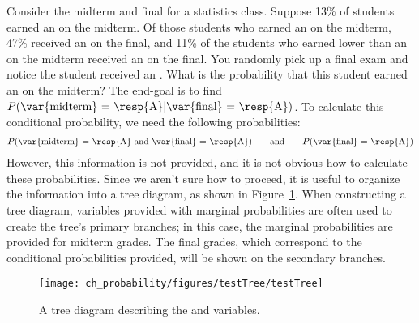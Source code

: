 \begin{example}{Consider the midterm and final for a statistics class. Suppose 13\% of students earned an  on the midterm. Of those students who earned an  on the midterm, 47\% received an  on the final, and 11\% of the students who earned lower than an  on the midterm received an  on the final. You randomly pick up a final exam and notice the student received an . What is the probability that this student earned an  on the midterm?} \label{exerciseForTreeDiagramOfStudentGettingAOnMidtermGivenThatSheGotAOnFinal}
The end-goal is to find $P(\text{\var{midterm} = \resp{A}} | \text{\var{final} = \resp{A}})$. To calculate this conditional probability, we need the following probabilities:
\begin{eqnarray*}
P(\text{\var{midterm} = \resp{A} and \var{final} = \resp{A}}) \qquad\text{and}\qquad
P(\text{\var{final} = \resp{A}})
\end{eqnarray*}
However, this information is not provided, and it is not obvious how to calculate these probabilities. Since we aren't sure how to proceed, it is useful to organize the information into a tree diagram, as shown in Figure~\ref{testTree}. When constructing a tree diagram, variables provided with marginal probabilities are often used to create the tree's primary branches; in this case, the marginal probabilities are provided for midterm grades. The final grades, which correspond to the conditional probabilities provided, will be shown on the secondary branches.

\begin{figure}[ht]
\centering
\texttt{[image: ch\_probability/figures/testTree/testTree]}
\caption{A tree diagram describing the  and  variables.}
\label{testTree}
\end{figure}


\end{example}
